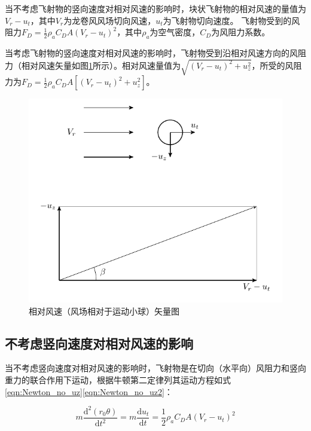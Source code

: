 \documentclass{ctexart}
\begin{document}
当不考虑飞射物的竖向速度对相对风速的影响时，块状飞射物的相对风速的量值为$V_r-u_t$，其中$V_r$为龙卷风风场切向风速，$u_t$为飞射物切向速度。
飞射物受到的风阻力$F_D=\frac{1}{2}\rho_a C_D A \left( V_r - u_t \right)^2 $，其中$\rho_a$为空气密度，$C_D$为风阻力系数。

当考虑飞射物的竖向速度对相对风速的影响时，飞射物受到沿相对风速方向的风阻力（相对风速矢量如图\ref{fig:relative_velocity}所示）。相对风速量值为$\sqrt{(V_r-u_t)^2+u_z^2}$，所受的风阻力为$F_D=\frac{1}{2} \rho_a C_D A \left[(V_r-u_t)^2+u_z^2\right] $。

\begin{figure}[h]
\centering
\includegraphics{./fig/relative_velocity}
\caption{相对风速（风场相对于运动小球）矢量图}
\label{fig:relative_velocity}
\end{figure}

\subsection{不考虑竖向速度对相对风速的影响}
当不考虑竖向速度对相对风速的影响时，飞射物是在切向（水平向）风阻力和竖向重力的联合作用下运动，根据牛顿第二定律列其运动方程如式\eqref{eqn:Newton_no_uz}\eqref{eqn:Newton_no_uz2}：

\begin{equation}
  \label{eqn:Newton_no_uz}
      m\frac{\mathrm{d}^2 \left(r_0 \theta \right)}{\mathrm{d} t^2} = m\frac{\mathrm{d} u_t}{\mathrm{d} t} = \frac{1}{2} \rho_a C_D A \left(V_r-u_t\right)^2
\end{equation}
\end{document}

